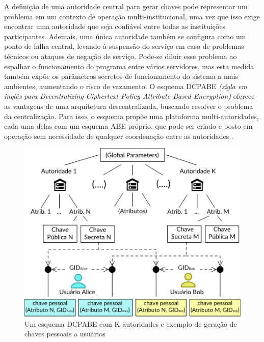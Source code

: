 \documentclass[a4paper,11pt]{article}
\begin{document}

A definição de uma autoridade central para gerar chaves pode representar um problema em um contexto de operação multi-institucional, uma vez que isso exige encontrar uma autoridade que seja confiável entre todas as instituições participantes.
Ademais, uma única autoridade também se configura como um ponto de falha central, levando à suspensão do serviço em caso de problemas técnicos ou ataques de negação de serviço.
Pode-se diluir esse problema ao espalhar o funcionamento do programa entre vários servidores, mas esta medida também expõe os parâmetros secretos de funcionamento do sistema a mais ambientes, aumentando o risco de vazamento.
O esquema DCPABE \emph{(sigla em inglês para Decentralizing Ciphertext-Policy Attribute-Based Encryption)} oferece as vantagens de uma arquitetura descentralizada, buscando resolver o problema da centralização.
Para isso, o esquema propõe uma plataforma multi-autoridades, cada uma delas com um esquema ABE próprio, que pode ser criado e posto em operação sem necessidade de qualquer coordenação entre as autoridades \cite{Lewko2011}.%

\begin{figure}[!h]
  \centering
  \includegraphics[width=\textwidth]{images/diagrama-DCPABE.png}
  \caption{Um esquema DCPABE com K autoridades e exemplo de geração de chaves pessoais a usuários}
  \label{fig:diagramaDCPABE}
\end{figure}
\end{document}
